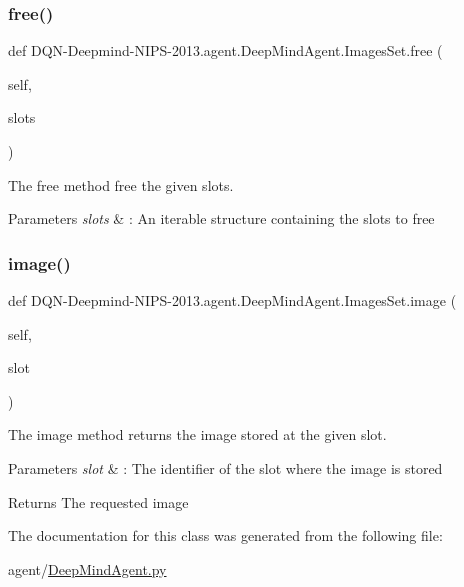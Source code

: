 \subsubsection{\texorpdfstring{free()}{free()}}
{\footnotesize\ttfamily def D\+QN-\/Deepmind-\/N\+I\+PS-\/2013.agent.\+Deep\+Mind\+Agent.\+Images\+Set.\+free (\begin{DoxyParamCaption}\item[{}]{self,  }\item[{}]{slots }\end{DoxyParamCaption})}



The free method free the given slots. 


\begin{DoxyParams}{Parameters}
{\em slots} & \+: An iterable structure containing the slots to free \\
\hline
\end{DoxyParams}
\hypertarget{classDQN-Deepmind-NIPS-2013_1_1agent_1_1DeepMindAgent_1_1ImagesSet_a044f2ad869a3ff4cf61a7e6eeccc502c}{}\label{classDQN-Deepmind-NIPS-2013_1_1agent_1_1DeepMindAgent_1_1ImagesSet_a044f2ad869a3ff4cf61a7e6eeccc502c} 
\subsubsection{\texorpdfstring{image()}{image()}}
{\footnotesize\ttfamily def D\+QN-\/Deepmind-\/N\+I\+PS-\/2013.agent.\+Deep\+Mind\+Agent.\+Images\+Set.\+image (\begin{DoxyParamCaption}\item[{}]{self,  }\item[{}]{slot }\end{DoxyParamCaption})}



The image method returns the image stored at the given slot. 


\begin{DoxyParams}{Parameters}
{\em slot} & \+: The identifier of the slot where the image is stored\\
\hline
\end{DoxyParams}
\begin{DoxyReturn}{Returns}
The requested image 
\end{DoxyReturn}


The documentation for this class was generated from the following file\+:\begin{DoxyCompactItemize}
\item 
agent/\hyperlink{DeepMindAgent_8py}{Deep\+Mind\+Agent.\+py}\end{DoxyCompactItemize}
